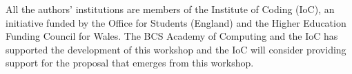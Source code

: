 \documentclass[sigplan,screen]{acmart}
\begin{document}
\begin{acks}
All the authors' institutions are members of the Institute of Coding (IoC), an initiative funded by the Office for Students (England) and the Higher Education Funding Council for Wales. The BCS Academy of Computing and the IoC has supported the development of this workshop and the IoC will consider providing support for the proposal that emerges from this workshop.
\end{acks}
    




\begin{comment}


\appendix

\end{comment}
\end{document}
